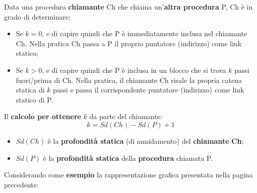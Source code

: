 \documentclass[a4paper]{article}
\begin{document}
	Data una procedura \textbf{chiamante} Ch che chiama un'\textbf{altra procedura} P, Ch è in grado di determinare:
	\begin{itemize}
		\item Se $k = 0$, e di capire quindi che P è immediatamente inclusa nel chiamante Ch.\newline
		Nella pratica Ch passa a P il proprio puntatore (indirizzo) come link statico;
		
		\item Se $k > 0$, e di capire quindi che P è inclusa in un blocco che si trova $k$ passi fuori/prima di Ch.\newline
		Nella pratica, il chiamante Ch risale la propria catena statica di $k$ passi e passa il corrispondente puntatore (indirizzo) come link statico di P.
	\end{itemize}
	Il \textcolor{Red3}{\textbf{calcolo per ottenere}} $k$ da parte del chiamante:
	\begin{equation*}
		k = Sd\left(Ch\right) - Sd\left(P\right) + 1
	\end{equation*}
	\begin{itemize}
		\item $Sd\left(Ch\right)$ è la \textbf{profondità statica} (di annidamento) del \textbf{chiamante} \textbf{Ch};
		
		\item $Sd\left(P\right)$ è la \textbf{profondità statica} della \textbf{procedura} chiamata P.
	\end{itemize}
	Considerando come \textcolor{Green4}{\textbf{esempio}} la rappresentazione grafica presentata nella pagina precedente:
\end{document}
